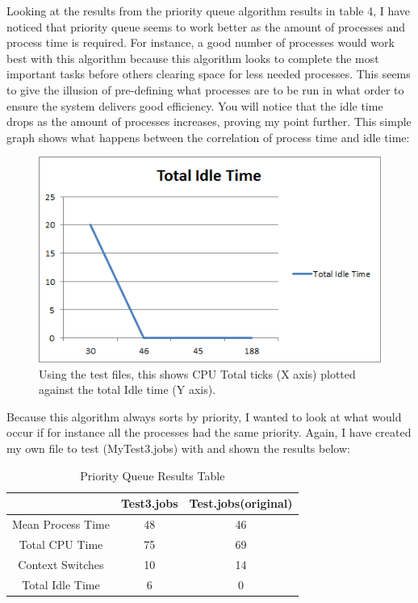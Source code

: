 \documentclass{sig-alternate}
\begin{document}
\vspace{5mm}

Looking at the results from the priority queue algorithm results in table 4, I
have noticed that priority queue seems to work better as the amount of processes
and process time is required. For instance, a good number of processes would
work best with this algorithm because this algorithm looks to complete the most
important tasks before others clearing space for less needed processes. This
seems to give the illusion of pre-defining what processes are to be run in what
order to ensure the system delivers good efficiency. You will notice that the
idle time drops as the amount of processes increases, proving my point further.
This simple graph shows what happens between the correlation of process time and
idle time:

\begin{figure}[!h]
\centering
\includegraphics[scale=0.6]{images/priority1.png}
\caption{Using the test files, this shows CPU Total ticks (X axis) plotted
against the total Idle time (Y axis).}
\end{figure}

 Because this algorithm always sorts by priority, I wanted to look at what would
occur if for instance all the processes had the same priority.  Again, I have
created my own file to test (MyTest3.jobs) with and shown the results below:

\begin{table}[!h]
\centering
\caption{Priority Queue Results Table}
\begin{tabular}{|c|c|c|} \hline
&Test3.jobs&Test.jobs(original)\\ \hline
Mean Process Time&48&46\\ \hline
Total CPU Time&75&69\\ \hline
Context Switches&10&14\\ \hline
Total Idle Time&6&0\\ \hline
\end{tabular}
\end{table}
\end{document}
